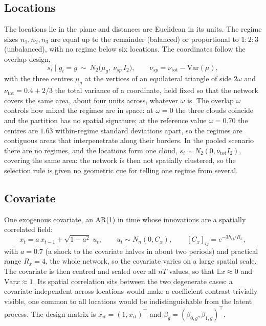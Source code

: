 \documentclass[11pt]{article}
\newcommand{\E}{\mathbb{E}}
\newcommand{\Var}{\mathrm{Var}}
\begin{document}
\subsection{Locations}

The locations lie in the plane and distances are Euclidean in its units. The regime sizes $n_1, n_2, n_3$ are equal up to the remainder (balanced) or proportional to $1:2:3$ (unbalanced), with no regime below six locations. The coordinates follow the overlap design,
\begin{equation}\label{eq:coords}
  s_i \mid g_i = g \ \sim\ N_2\bigl(\mu_g,\ \nu_{sp}\, I_2\bigr), \qquad \nu_{sp} = \nu_{\mathrm{tot}} - \Var(\mu),
\end{equation}
with the three centres $\mu_g$ at the vertices of an equilateral triangle of side $2\omega$ and $\nu_{\mathrm{tot}} = 0.4 + 2/3$ the total variance of a coordinate, held fixed so that the network covers the same area, about four units across, whatever $\omega$ is. The overlap $\omega$ controls how mixed the regimes are in space: at $\omega = 0$ the three clouds coincide and the partition has no spatial signature; at the reference value $\omega = 0.70$ the centres are $1.63$ within-regime standard deviations apart, so the regimes are contiguous areas that interpenetrate along their borders. In the pooled scenario there are no regimes, and the locations form one cloud, $s_i \sim N_2(0, \nu_{\mathrm{tot}} I_2)$, covering the same area: the network is then not spatially clustered, so the selection rule is given no geometric cue for telling one regime from several.

\subsection{Covariate}

One exogenous covariate, an AR(1) in time whose innovations are a spatially correlated field:
\begin{equation}\label{eq:cov}
  x_t = a\, x_{t-1} + \sqrt{1-a^2}\; u_t, \qquad u_t \sim N_n(0, C_x), \qquad [C_x]_{ij} = e^{-3 h_{ij}/R_x},
\end{equation}
with $a = 0.7$ (a shock to the covariate halves in about two periods) and practical range $R_x = 4$, the whole network, so the covariate varies on a large spatial scale. The covariate is then centred and scaled over all $nT$ values, so that $\E x \approx 0$ and $\Var x \approx 1$. Its spatial correlation sits between the two degenerate cases: a covariate independent across locations would make a coefficient contrast trivially visible, one common to all locations would be indistinguishable from the latent process. The design matrix is $x_{it} = (1, x_{it})^\top$ and $\beta_g = (\beta_{0,g}, \beta_{1,g})^\top$.
\end{document}
